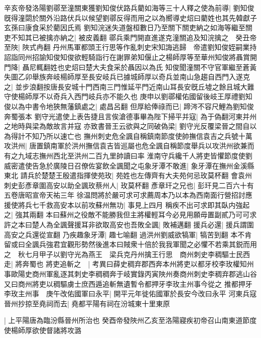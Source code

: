 辛亥帝發洛陽劉鄩至潼關東獲劉知俊伏路兵藺如海等三十人釋之使為前導|{
	劉知俊旣得潼閟於關外沿路伏兵以候望劉鄩反得而用之以為嚮導史炤曰藺姓也其先韓獻子玄孫曰康食采於藺因氏焉}
劉知浣迷失道盤桓數日乃至關下關吏納之如海等繼至關吏不知其已被擒亦納之|{
	被皮義翻}
鄩兵乘門開直進遂克潼關追及知浣擒之　癸丑帝至陜|{
	陜式冉翻}
丹州馬軍都頭王行思等作亂刺史宋知誨逃歸　帝遣劉知俊姪嗣業持詔詣同州招諭知俊知俊欲輕騎詣行在謝罪弟知偃止之楊師厚等至華州知俊將聶賞開門降|{
	聶尼輒翻姓也史炤曰楚大夫食采於聶因以為氏}
知俊聞潼關不守官軍繼至蒼黃失圖乙卯舉族奔岐楊師厚至長安岐兵已據城師厚以奇兵並南山急趨自西門入遂克之|{
	並步浪翻按唐長安城十門西南三門惟延平門近南山耳長安旣丘墟之餘且城大難守使楊師厚不以奇兵入西門岐兵亦不能久也}
庚申以劉鄩權佑國留後岐王厚禮劉知俊以為中書令地狹無藩鎮處之|{
	處昌呂翻}
但厚給俸祿而已|{
	蹄涔不容尺鯉為劉知俊奔蜀張本}
劉守光遣使上表告捷且言俟滄德事畢為陛下掃平并寇|{
	為于偽翻河東并州之地時與梁為敵故言并寇}
亦致書晉王云欲與之同破偽梁|{
	劉守光反覆梁晉之間自以為得計不知乃所以速亡也}
撫州刺史危全諷自稱鎮南節度使帥撫信袁吉之兵號十萬攻洪州|{
	唐置鎮南軍於洪州撫信袁吉皆巡屬也危全諷自稱節度舉兵以攻洪州欲兼而有之九域志撫州西北至洪州二百九里帥讀曰率}
淮南守兵纔千人將吏皆懼節度使劉威密遣使告急於廣陵日召僚佐宴飲全諷聞之屯象牙潭不敢進|{
	象牙潭在撫州金溪縣東北}
請兵於楚楚王殷遣指揮使苑玫|{
	苑姓也左傳齊有大夫苑何忌玫莫杯翻}
會袁州刺史彭彥章圍高安以助全諷玫蔡州人|{
	玫莫杯翻}
彥章玕之兄也|{
	彭玕見二百六十有五卷唐昭宣帝天祐三年}
徐温問將於嚴可求可求薦周本乃以本為西南面行營招討應援使將兵七千救高安本以前攻蘇州無功|{
	事見上四月}
稱疾不出可求即其臥内強起之|{
	強其兩翻}
本曰蘇州之役敵不能勝我但主將權輕耳今必見用願毋置副貳乃可可求許之本曰楚人為全諷聲援耳非欲取高安也吾敗全諷|{
	敗補邁翻}
援兵必還|{
	援兵謂圍高安之兵還從宣翻}
乃疾趣象牙潭|{
	趣七喻翻}
過洪州劉威欲犒軍|{
	犒苦到翻}
本不肯留或曰全諷兵強君宜觀形勢然後進本曰賊衆十倍於我我軍聞之必懼不若乘其鋭而用之　秋七月甲子以劉守光為燕王　梁兵克丹州擒王行思　商州刺史李稠驅士民西走|{
	將奔蜀也}
將吏追斬之　|{
	考異曰薛史稠弃郡西奔本州將吏以都牙校李玫權知州事歐陽史商州軍亂逐其刺史李稠稠奔于岐實錄丙寅陜州奏商州刺史李稠弃郡逃山谷又曰商州將吏以稠驅虜士庶西遁追斬無遺暫令都押牙李玫主州事今從之}
推都押牙李玫主州事　庚午改佑國軍曰永平|{
	開平元年徙佑國軍於長安今改曰永平}
河東兵寇晉州抄掠至堯祠而去|{
	堯都平陽有祠在汾城東十里東原}


|{
	上平陽唐為臨汾縣晉州所治也}
癸酉帝發陜州乙亥至洛陽寢疾初帝召山南東道節度使楊師厚欲使督諸將攻潞

